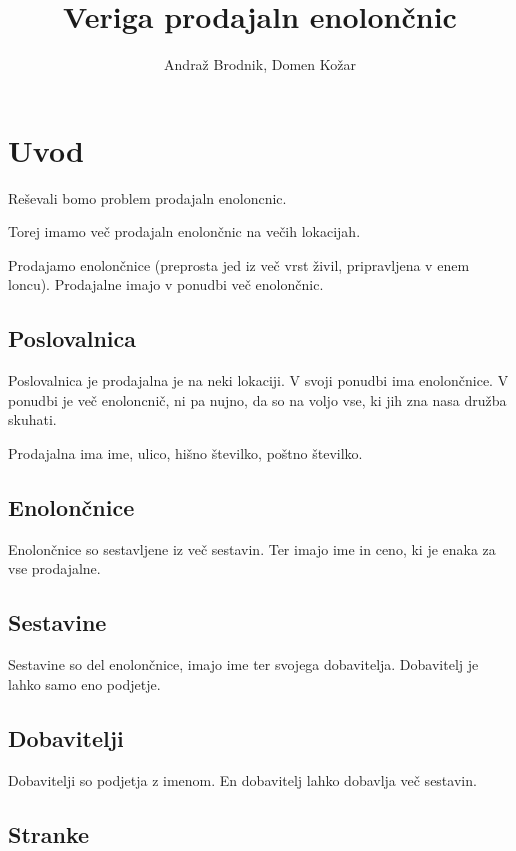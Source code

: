 \documentclass[12pt]{article}
\title{Veriga prodajaln enolončnic}
\author{Andraž Brodnik, Domen Kožar}
\let\stdsection\section
\renewcommand\section{\newpage\stdsection}
\begin{document}

\maketitle

\tableofcontents


\section{Uvod}


Reševali bomo problem prodajaln enoloncnic. 

Torej imamo več prodajaln enolončnic na večih lokacijah.

Prodajamo enolončnice (preprosta jed iz več vrst živil, pripravljena v enem loncu). Prodajalne imajo v ponudbi več enolončnic.

\subsection{Poslovalnica}

Poslovalnica je prodajalna je na neki lokaciji. V svoji ponudbi ima enolončnice. V ponudbi je več enoloncnič, ni pa nujno, da so na voljo vse, ki jih zna nasa družba skuhati.

Prodajalna ima ime, ulico, hišno številko, poštno številko.

\subsection{Enolončnice}

Enolončnice so sestavljene iz več sestavin. Ter imajo ime in ceno, ki je enaka za vse prodajalne.


\subsection{Sestavine}

Sestavine so del enolončnice, imajo ime ter svojega dobavitelja. Dobavitelj je lahko samo eno podjetje.

\subsection{Dobavitelji}

Dobavitelji so podjetja z imenom. En dobavitelj lahko dobavlja več sestavin.

\subsection{Stranke}
\end{document}
